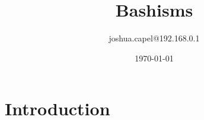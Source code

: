 \documentclass{article}
\title{Bashisms}
\author{joshua.capel@192.168.0.1}
\date{\today}
\begin{document}
\maketitle

\section{Introduction}
\end{document}

